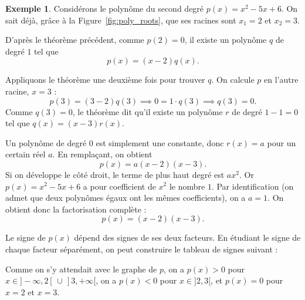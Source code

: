 \documentclass[12pt,a4paper]{article}
\theoremstyle{plain}
\theoremstyle{definition}
\newtheorem{example}[theorem]{Exemple}
\theoremstyle{remark}
\begin{document}
\begin{example}
  Considérons le polynôme du second degré $p(x) = x^2 - 5x + 6$. On sait déjà,
  grâce à la Figure~\ref{fig:poly_roots}, que ses racines sont $x_1 = 2$ et $x_2 = 3$.
  
  D'après le théorème précédent, comme $p(2) = 0$, il existe un polynôme $q$
  de degré $1$ tel que
  \[
  p(x) = (x - 2)q(x).
  \]
  
  Appliquons le théorème une deuxième fois pour trouver $q$. On calcule $p$ en
  l'autre racine, $x = 3$ :
  \[
  p(3) = (3 - 2)q(3) \implies 0 = 1 \cdot q(3) \implies q(3) = 0.
  \]
  Comme $q(3) = 0$, le théorème dit qu'il existe un polynôme $r$ de degré
  $1 - 1 = 0$ tel que $q(x) = (x - 3)r(x)$.
  
  Un polynôme de degré $0$ est simplement une constante, donc $r(x) = a$ pour un
  certain réel $a$. En remplaçant, on obtient
  \[
  p(x) = a(x - 2)(x - 3).
  \]
  Si on développe le côté droit, le terme de plus haut degré est $ax^2$. Or
  $p(x) = x^2 - 5x + 6$ a pour coefficient de $x^2$ le nombre $1$. Par
  identification (on admet que deux polynômes égaux ont les mêmes coefficients),
  on a $a = 1$. On obtient donc la factorisation complète :
  \[
  p(x) = (x - 2)(x - 3).
  \]
  
  Le signe de $p(x)$ dépend des signes de ses deux facteurs. En étudiant le signe
  de chaque facteur séparément, on peut construire le tableau de signes suivant :
  
  \begin{center}
  \end{center}
  
  Comme on s'y attendait avec le graphe de $p$, on a $p(x) > 0$ pour
  $x \in ]-\infty, 2[ \,\cup\, ]3, +\infty[$, on a $p(x) < 0$ pour
  $x \in ]2, 3[$, et $p(x) = 0$ pour $x = 2$ et $x = 3$.
\end{example}
\end{document}
